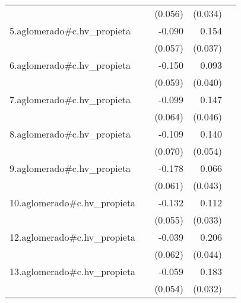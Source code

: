 {\begin{longtable}{l*{4}{D{.}{.}{-1}}}
            &                     &     (0.056)         &     (0.034)         &                     \\
\addlinespace
5.aglomerado#c.hv\_propieta&                     &      -0.090         &       0.154\sym{***}&                     \\
            &                     &     (0.057)         &     (0.037)         &                     \\
\addlinespace
6.aglomerado#c.hv\_propieta&                     &      -0.150\sym{*}  &       0.093\sym{*}  &                     \\
            &                     &     (0.059)         &     (0.040)         &                     \\
\addlinespace
7.aglomerado#c.hv\_propieta&                     &      -0.099         &       0.147\sym{**} &                     \\
            &                     &     (0.064)         &     (0.046)         &                     \\
\addlinespace
8.aglomerado#c.hv\_propieta&                     &      -0.109         &       0.140\sym{**} &                     \\
            &                     &     (0.070)         &     (0.054)         &                     \\
\addlinespace
9.aglomerado#c.hv\_propieta&                     &      -0.178\sym{**} &       0.066         &                     \\
            &                     &     (0.061)         &     (0.043)         &                     \\
\addlinespace
10.aglomerado#c.hv\_propieta&                     &      -0.132\sym{*}  &       0.112\sym{***}&                     \\
            &                     &     (0.055)         &     (0.033)         &                     \\
\addlinespace
12.aglomerado#c.hv\_propieta&                     &      -0.039         &       0.206\sym{***}&                     \\
            &                     &     (0.062)         &     (0.044)         &                     \\
\addlinespace
13.aglomerado#c.hv\_propieta&                     &      -0.059         &       0.183\sym{***}&                     \\
            &                     &     (0.054)         &     (0.032)         &                     \\

\end{longtable}}
